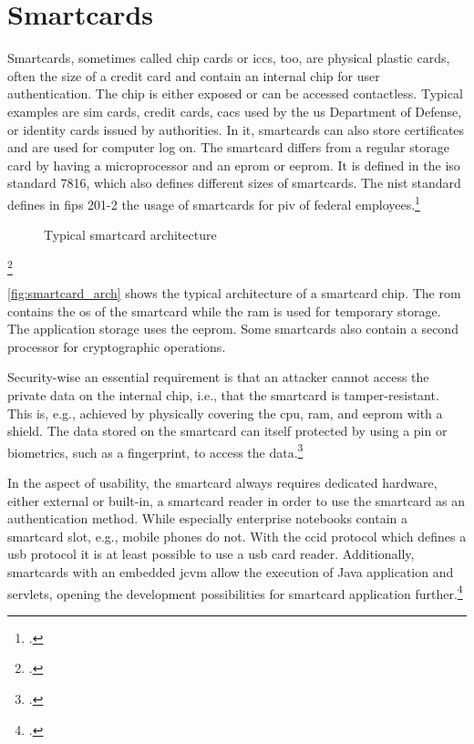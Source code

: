 \section{Smartcards}

Smartcards, sometimes called chip cards or \glspl{icc}, too, are physical plastic cards, often the size of a credit card and contain an internal chip for user authentication. The chip is either exposed or can be accessed contactless. Typical examples are \gls{sim} cards, credit cards, \glspl{cac} used by the \gls{us} Department of Defense, or identity cards issued by authorities. In \gls{it}, smartcards can also store certificates and are used for computer log on. The smartcard differs from a regular storage card by having a microprocessor and an \gls{eprom} or \gls{eeprom}. It is defined in the \gls{iso} standard 7816, which also defines different sizes of smartcards. The \gls{nist} standard defines in \gls{fips} 201-2 the usage of smartcards for \gls{piv} of federal employees.\footcites[See][525--527]{eckert-it-sec-9}[See][]{iso7816}[See][6--9]{1698485}[See][]{FIPS201-2}


\begin{figure}[hbt]
	\centering
	
	\caption[Typical smartcard architecture]{Typical smartcard architecture\footnotemark}
	\label{fig:smartcard_arch}
\end{figure}
\footcitetexts[Source: diagram by author, based on][33]{electronic_certification_mobile_devices}[][228]{1698485}

\autoref{fig:smartcard_arch} shows the typical architecture of a smartcard chip. The \gls{rom} contains the \gls{os} of the smartcard while the \gls{ram} is used for temporary storage. The application storage uses the \gls{eeprom}. Some smartcards also contain a second processor for cryptographic operations.

Security-wise an essential requirement is that an attacker cannot access the private data on the internal chip, i.e., that the smartcard is tamper-resistant. This is, e.g., achieved by physically covering the \gls{cpu}, \gls{ram}, and \gls{eeprom} with a shield. The data stored on the smartcard can itself protected by using a \gls{pin} or biometrics, such as a fingerprint, to access the data.\footcites[See][34]{265831}[See][228]{1698485}

In the aspect of usability, the smartcard always requires dedicated hardware, either external or built-in, a smartcard reader in order to use the smartcard as an authentication method. While especially enterprise notebooks contain a smartcard slot, e.g., mobile phones do not. With the \gls{ccid} protocol which defines a \gls{usb} protocol it is at least possible to use a \gls{usb} card reader. Additionally, smartcards with an embedded \gls{jcvm} allow the execution of Java application and servlets, opening the development possibilities for smartcard application further.\footcites[See][65]{1698485}[See][539]{eckert-it-sec-9}